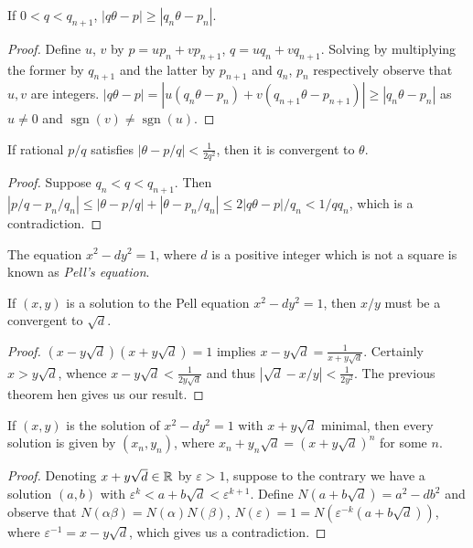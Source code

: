 \documentclass[a4paper, 10pt]{amsart}
\begin{document}
\begin{theorem}
  If $0 < q< q_{n + 1}$, $|q \theta - p| \geq |q_n \theta - p_n|$.
\end{theorem}
\begin{proof}
  Define $u$, $v$ by $p = u p_n + v p_{n + 1}$, $q = u q_n + v q_{n + 1}$. Solving by multiplying the former by $q_{n + 1}$ and the latter by $p_{n + 1}$ and $q_n$, $p_n$ respectively observe that $u, v$ are integers. $|q \theta -  p| = |u(q_n \theta - p_n) + v(q_{n + 1} \theta - p_{n + 1})| \geq |q_n \theta - p_n|$ as $u \neq 0$ and $\operatorname{sgn}(v) \neq \operatorname{sgn}(u)$.
\end{proof}

\begin{theorem}
  If rational $p/q$ satisfies $|\theta - p/q| < \frac{1}{2q^2}$, then it is convergent to $\theta$.
\end{theorem}
\begin{proof}
  Suppose $q_n < q< q_{n + 1}$. Then $|p/q - p_n/q_n| \leq |\theta - p/q| + |\theta - p_n /q_n| \leq 2 |q \theta - p|/q_n < 1/q q_n$, which is a contradiction.
\end{proof}

\begin{definition}
  The equation $x^2 - dy^2 = 1$, where $d$ is a positive integer which is not a square is known as \emph{Pell's equation}.
\end{definition}

\begin{theorem}
  If $(x, y)$ is a solution to the Pell equation $x^2 - dy^2 = 1$, then $x/y$ must be a convergent to $\sqrt{d}$.
\end{theorem}
\begin{proof}
  $(x - y \sqrt{d})(x + y \sqrt{d}) = 1$ implies $x - y \sqrt{d} = \frac{1}{x + y \sqrt{d}}$. Certainly $x > y \sqrt{d}$, whence $x - y \sqrt{d} < \frac{1}{2y \sqrt{d}}$ and thus $|\sqrt{d} - x/y| < \frac{1}{2y^2}$. The previous theorem hen gives us our result.
\end{proof}

\begin{theorem}
  If $(x, y)$ is the solution of $x^2 - dy^2 = 1$ with $x + y \sqrt{d}$ minimal, then every solution is given by $(x_n, y_n)$, where $x_n + y_n \sqrt{d} = (x + y \sqrt{d})^n$ for some $n$.
\end{theorem}
\begin{proof}
  Denoting $x + y \sqrt{d} \in \mathbb{R}$ by $\varepsilon > 1$, suppose to the contrary we have a solution $(a, b)$ with $\varepsilon^k < a + b \sqrt{d} < \varepsilon^{k + 1}$. Define $N(a + b\sqrt{d}) = a^2 - db^2$ and observe that $N(\alpha \beta) = N(\alpha)N(\beta)$, $N(\varepsilon) = 1 = N(\varepsilon^{-k}(a + b \sqrt{d}))$, where $\varepsilon^{-1} = x - y \sqrt{d}$, which gives us a contradiction.
\end{proof}
\end{document}
